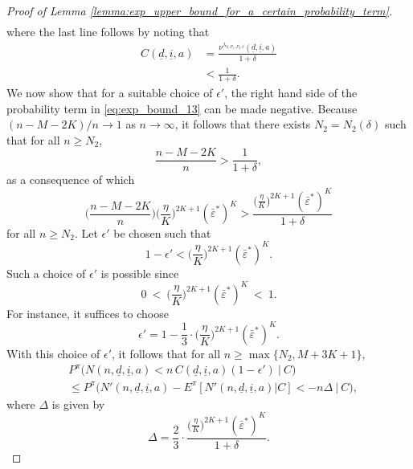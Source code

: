 \begin{proof}[Proof of Lemma \ref{lemma:exp_upper_bound_for_a_certain_probability_term}]
\begin{align}
	\label{eq:exp_bound_13}
\end{align}
where the last line follows by noting that
\begin{align*}
	C(\underline{d}, \underline{i}, a)
	&=\frac{\nu^{\lambda_{h, P_1, P_2, \delta}}(\underline{d}, \underline{i}, a)}{1+\delta}\\
	&<\frac{1}{1+\delta}.
\end{align*}
We now show that for a suitable choice of $\epsilon'$, the right hand side of the probability term in \eqref{eq:exp_bound_13} can be made negative. Because $(n-M-2K)/n \longrightarrow 1$ as $n\to\infty$, it follows that there exists $N_2=N_2(\delta)$ such that for all $n\geq N_2$, $$ \frac{n-M-2K}{n} > \frac{1}{1+\delta}, $$
 as a consequence of which $$ \bigg(\frac{n-M-2K}{n}\bigg)\bigg(\frac{\eta}{K}\bigg)^{2K+1}(\bar{\varepsilon}^*)^K > \frac{\bigg(\frac{\eta}{K}\bigg)^{2K+1}(\bar{\varepsilon}^*)^K}{1+\delta} $$ for all $n\geq N_2$.
Let $\epsilon'$ be chosen such that
\begin{equation}
	1-\epsilon' < \bigg(\frac{\eta}{K}\bigg)^{2K+1}(\bar{\varepsilon}^*)^K.
	\label{eq:equation_defining_epsilon'}
\end{equation}
Such a choice of $\epsilon'$ is possible since $$ 0~<~\bigg(\frac{\eta}{K}\bigg)^{2K+1}(\bar{\varepsilon}^*)^K~<~1. $$
For instance, it suffices to choose
\begin{equation}
	\epsilon'=1-\frac{1}{3}\cdot \bigg(\frac{\eta}{K}\bigg)^{2K+1}(\bar{\varepsilon}^*)^K.
	\label{eq:value_of_epsilon'}
\end{equation}
With this choice of $\epsilon'$, it follows that for all $n\geq \max\{N_2, M+3K+1\}$,
\begin{align}
	&P^\pi\bigg(N(n, \underline{d}, \underline{i}, a) < n\,C(\underline{d}, \underline{i}, a)(1-\epsilon')~\bigg|~C\bigg) \nonumber\\
	& \leq P^\pi\bigg(N'(n, \underline{d}, \underline{i}, a) -E^\pi[N'(n, \underline{d}, \underline{i}, a)|C] < -n \Delta ~\bigg|~C\bigg),
	\label{eq:exp_bound_17}
\end{align}
where $\Delta$ is given by $$ \Delta = \frac{2}{3}\cdot \frac{\bigg(\frac{\eta}{K}\bigg)^{2K+1}(\bar{\varepsilon}^*)^K}{1+\delta}. $$


\end{proof}
